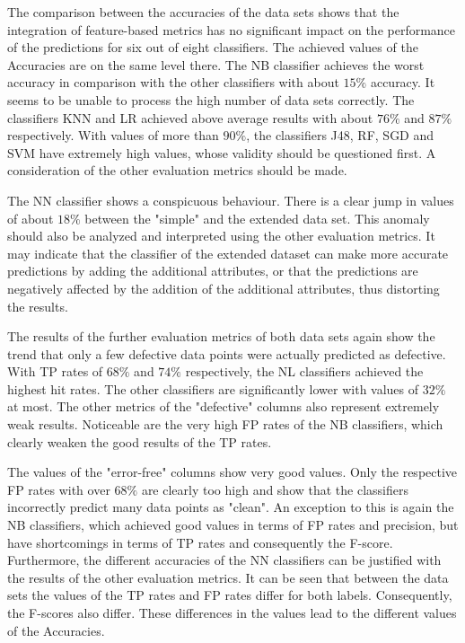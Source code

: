 The comparison between the accuracies of the data sets shows that the integration of feature-based metrics has no significant impact on the performance of the predictions for six out of eight classifiers. The achieved values of the Accuracies are on the same level there. The NB classifier achieves the worst accuracy in comparison with the other classifiers with about $15\%$ accuracy. It seems to be unable to process the high number of data sets correctly. The classifiers KNN and LR achieved above average results with about $76\%$ and $87\%$ respectively. With values of more than $90\%$, the classifiers J48, RF, SGD and SVM have extremely high values, whose validity should be questioned first. A consideration of the other evaluation metrics should be made.

The NN classifier shows a conspicuous behaviour. There is a clear jump in values of about $18\%$ between the "simple" and the extended data set. This anomaly should also be analyzed and interpreted using the other evaluation metrics. It may indicate that the classifier of the extended dataset can make more accurate predictions by adding the additional attributes, or that the predictions are negatively affected by the addition of the additional attributes, thus distorting the results.

The results of the further evaluation metrics of both data sets again show the trend that only a few defective data points were actually predicted as defective. With TP rates of $68\%$ and $74\%$ respectively, the NL classifiers achieved the highest hit rates. The other classifiers are significantly lower with values of $32\%$ at most. The other metrics of the "defective" columns also represent extremely weak results. Noticeable are the very high FP rates of the NB classifiers, which clearly weaken the good results of the TP rates.

The values of the "error-free" columns show very good values. Only the respective FP rates with over $68\%$ are clearly too high and show that the classifiers incorrectly predict many data points as "clean". An exception to this is again the NB classifiers, which achieved good values in terms of FP rates and precision, but have shortcomings in terms of TP rates and consequently the F-score. Furthermore, the different accuracies of the NN classifiers can be justified with the results of the other evaluation metrics. It can be seen that between the data sets the values of the TP rates and FP rates differ for both labels. Consequently, the F-scores also differ. These differences in the values lead to the different values of the Accuracies.


